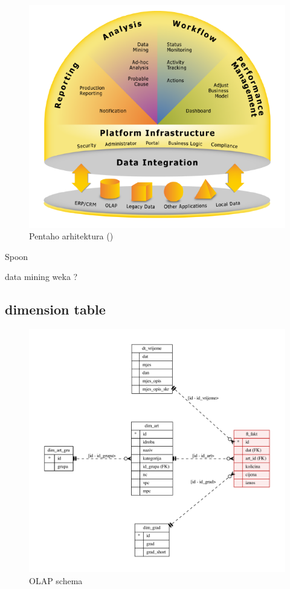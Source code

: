 \documentclass[times, utf8, seminar]{fit}
\begin{document}
\begin{figure}
\centering
\includegraphics[width=15cm]{img/pentaho_arhitektura_eric.png}
\caption{Pentaho arhitektura (\cite{web:eric})}
\end{figure}



Spoon

data mining weka ?


\subsection{dimension table}

\begin{figure}
\centering
\includegraphics[width=15cm]{img/F18_olap.pdf}
\caption{OLAP schema}
\end{figure}
\end{document}

